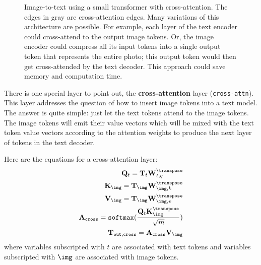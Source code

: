 \begin{figure}[h]
{
    }
    \caption{Image-to-text using a small transformer with cross-attention. The edges in gray are cross-attention edges. Many variations of this architecture are possible. For example, each layer of the text encoder could cross-attend to the output image tokens. Or, the image encoder could compress all its input tokens into a single output token that represents the entire photo; this output token would then get cross-attended by the text decoder. This approach could save memory and computation time.}
    \label{fig:VLMs:im2text}
\end{figure}

There is one special layer to point out, the \textbf{cross-attention} layer (\texttt{cross-attn}). This layer addresses the question of how to insert image tokens into a text model. The answer is quite simple: just let the text tokens attend to the image tokens. The image tokens will emit their value vectors which will be mixed with the text token value vectors according to the attention weights to produce the next layer of tokens in the text decoder.

Here are the equations for a cross-attention layer:
\begin{align}
    \mathbf{Q}_{t} = \mathbf{T}_{t}\mathbf{W}_{t,q}^\transpose                                                  \\
    \mathbf{K}_{\img} = \mathbf{T}_{\img}\mathbf{W}_{\img,k}^\transpose                                         \\
    \mathbf{V}_{\img} = \mathbf{T}_{\img}\mathbf{W}_{\img,v}^\transpose                                         \\
    \mathbf{A}_{\texttt{cross}} = \texttt{softmax}(\frac{\mathbf{Q}_{t}\mathbf{K}_{\img}^\transpose}{\sqrt{m}}) \\
    \mathbf{T}_{\texttt{out}, \texttt{cross}} = \mathbf{A}_{\texttt{cross}}\mathbf{V}_{\img}
\end{align}
where variables subscripted with $t$ are associated with text tokens and variables subscripted with $\img$ are associated with image tokens.

